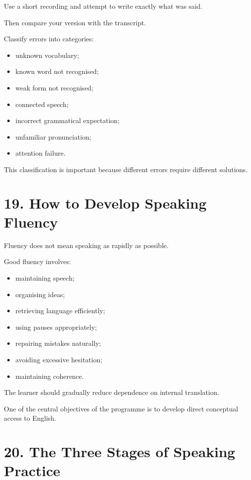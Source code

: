 Use a short recording and attempt to write exactly what was said.

Then compare your version with the transcript.

Classify errors into categories:

\begin{itemize}
    \item unknown vocabulary;
    \item known word not recognised;
    \item weak form not recognised;
    \item connected speech;
    \item incorrect grammatical expectation;
    \item unfamiliar pronunciation;
    \item attention failure.
\end{itemize}

This classification is important because different errors require different solutions.

\section*{19. How to Develop Speaking Fluency}

Fluency does not mean speaking as rapidly as possible.

Good fluency involves:

\begin{itemize}
    \item maintaining speech;
    \item organising ideas;
    \item retrieving language efficiently;
    \item using pauses appropriately;
    \item repairing mistakes naturally;
    \item avoiding excessive hesitation;
    \item maintaining coherence.
\end{itemize}

The learner should gradually reduce dependence on internal translation.

One of the central objectives of the programme is to develop direct conceptual access to English.

\section*{20. The Three Stages of Speaking Practice}

